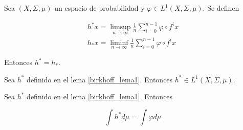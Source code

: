 \begin{lema}\label{birkhoff_lema1}
	Sea $(X,\Sigma,\mu)$ un espacio de probabilidad y $\varphi \in L^1(X,\Sigma,\mu)$. Se definen
	
	\begin{gather}
		h^* x = \limsup_{n \rightarrow \infty} \frac{1}{n} \sum_{i=0}^{n-1} \varphi \circ f^i x\\
		h_* x = \liminf_{n \rightarrow \infty} \frac{1}{n} \sum_{i=0}^{n-1} \varphi \circ f^i x
	\end{gather}
	
	Entonces $h^* = h_*$.
	
\end{lema}

\begin{lema}\label{birkhoff_lema2}
	Sea $h^*$  definido en el lema \ref{birkhoff_lema1}. Entonces $h^* \in L^1(X,\Sigma,\mu)$.
\end{lema}

\begin{lema}\label{birkhoff_lema3}
	Sea $h^*$  definido en el lema \ref{birkhoff_lema1}. Entonces
	
	\begin{equation}
		\int h^* d\mu = \int \varphi d\mu
	\end{equation}
\end{lema}


